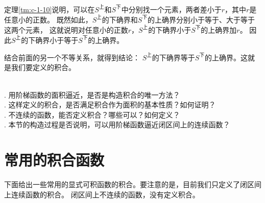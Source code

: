 \documentclass[12pt,UTF8]{ctexbook}
\begin{document}
\begin{appendix}
定理\ref{tm:c-1-10}说明，可以在$S^{\text{上}}$和$S^{\text{下}}$中分别找一个元素，两者差小于$r$，其中$r$是任意小的正数。
既然如此，$S^{\text{上}}$的下确界和$S^{\text{下}}$的上确界分别小于等于、大于等于这两个元素，
这就说明对任意小的正数$r$，$S^{\text{上}}$的下确界小于$S^{\text{下}}$的上确界加$r$。
因此$S^{\text{上}}$的下确界小于等于$S^{\text{下}}$的上确界。

结合前面的另一个不等关系，就得到结论：
$S^{\text{上}}$的下确界等于$S^{\text{下}}$的上确界。这就是我们要定义的积合。

\begin{sk}
    \mbox{} \\
    . 用阶梯函数的面积逼近，是否是构造积合的唯一方法？ \\
    . 这样定义的积合，是否满足积合作为面积的基本性质？如何证明？\\
    . 不连续的函数，能否定义积合？哪些可以？如何定义？\\
    . 本节的构造过程是否说明，可以用阶梯函数逼近闭区间上的连续函数？
\end{sk}

\section{常用的积合函数}

下面给出一些常用的显式可积函数的积合。要注意的是，目前我们只定义了闭区间上连续函数的积合。
闭区间上不连续的函数，没有定义积合。


\end{appendix}
\end{document}
